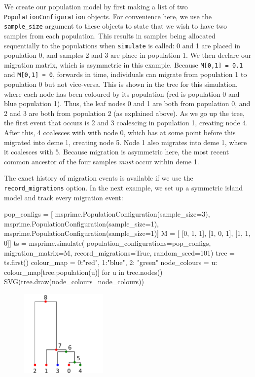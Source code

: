 \documentclass[graybox]{svmult}
\newcommand{\includenbimage}[1]{\begin{center}\texttt{[image: \#1]}\end{center}}
\begin{document}
    We create our population model by first making a list of two
\texttt{PopulationConfiguration} objects. For convenience here, we use
the \texttt{sample\_size} argument to these objects to state that we
wish to have two samples from each population. This results in samples
being allocated sequentially to the populations when \texttt{simulate}
is called: 0 and 1 are placed in population 0, and samples 2 and 3 are
place in population 1. We then declare our migration matrix, which is
asymmetric in this example. Because \texttt{M{[}0,1{]}\ =\ 0.1} and
\texttt{M{[}0,1{]}\ =\ 0}, forwards in time, individuals can migrate
from population 1 to population 0 but not vice-versa. This is shown in
the tree for this simulation, where each node has been coloured by its
population (red is population 0 and blue population 1). Thus, the leaf
nodes 0 and 1 are both from population 0, and 2 and 3 are both from
population 2 (as explained above). As we go up the tree, the first event
that occurs is 2 and 3 coalescing in population 1, creating node 4.
After this, 4 coalesces with with node 0, which has at some point before
this migrated into deme 1, creating node 5. Node 1 also migrates into
deme 1, where it coalesces with 5. Because migration is asymmetric here,
the most recent common ancestor of the four samples \emph{must} occur
within deme 1.

The exact history of migration events is available if we use the
\texttt{record\_migrations} option. In the next example, we set up a
symmetric island model and track every migration event:

\begin{pythoncode}
pop_configs = [
    msprime.PopulationConfiguration(sample_size=3),
    msprime.PopulationConfiguration(sample_size=1),
    msprime.PopulationConfiguration(sample_size=1)]
M = [
    [0, 1, 1],
    [1, 0, 1],
    [1, 1, 0]]
ts  = msprime.simulate(
    population_configurations=pop_configs, migration_matrix=M,
    record_migrations=True, random_seed=101)
tree = ts.first()
colour_map = {0:"red", 1:"blue", 2: "green"}
node_colours = {
    u: colour_map[tree.population(u)] for u in tree.nodes()}
SVG(tree.draw(node_colours=node_colours))
\end{pythoncode}

\begin{figure}
  \begin{center}
    \includegraphics[width=0.38\textwidth]{images/simulations_28_0.pdf}
    \end{center}
\end{figure}
\end{document}
